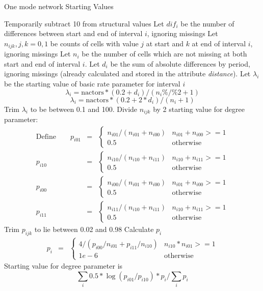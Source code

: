 \documentclass[12pt,a4paper]{article}
\makeatletter
\renewcommand{\=}{\,=\,}
\newcommand{\+}{\,+\,}
\newcommand{\nnm}[1]{\textsf{\textit{#1}}}
\renewcommand{\subsection}{\@startsection{subsection}{2}
                {0pt}{0.7\baselineskip}{0.3\baselineskip}
                {\sffamily} }
\makeatother
\begin{document}
\subsection{One mode network Starting Values}
\label{sec:onemodestart}
\begin{algorithmic}
\STATE Temporarily subtract 10 from structural values
\STATE Let $dif_i$ be the number of differences between start and end of
interval $i$, ignoring missings
\STATE Let $n_{ijk}, j, k = 0,1$ be counts of cells with value $j$ at start
and $k$ at end of interval $i$, ignoring missings
\STATE Let $n_i$ be the number of cells which are not missing at both start
and end of interval $i$.
\STATE Let $d_i$ be the sum of absolute differences by period, ignoring missings
(already calculated and stored in the attribute \nnm{distance}).
\STATE Let $\lambda_i$ be the starting value of basic rate parameter for
interval $i$
\STATE
$$\lambda_i = \mathrm{nactors} * (0.2 + d_i)/(n_i \%/\% 2 + 1)$$
\ELSE
\STATE
$$\lambda_i = \mathrm{nactors} * (0.2 + 2 * d_i)/(n_i + 1)$$
\ENDIF
\STATE Trim $\lambda_i$ to be between 0.1 and 100.
\STATE Divide $n_{ijk}$ by 2
\ENDIF
\STATE starting value for degree parameter:
\begin{align*}
\mathrm{Define } \qquad  p_{i01} &=& \begin{cases}
n_{i01}/ (n_{i01} + n_{i00}) &n_{i01} + n_{i00} >= 1  \\
0.5& \mathrm{otherwise}
\end{cases}\\
p_{i10} &=& \begin{cases}
n_{i10}/ (n_{i10} + n_{i11}) &n_{i10} + n_{i11} >= 1  \\
0.5& \mathrm{otherwise}
\end{cases}\\
  p_{i00} &=& \begin{cases}
n_{i00}/ (n_{i01} + n_{i00}) &n_{i01} + n_{i00} >= 1  \\
0.5& \mathrm{otherwise}
\end{cases}\\
p_{i11} &=& \begin{cases}
n_{i11}/ (n_{i10} + n_{i11}) &n_{i10} + n_{i11} >= 1  \\
0.5& \mathrm{otherwise}
\end{cases}
\end{align*}
\STATE Trim $p_{ijk}$ to lie between 0.02 and 0.98
\STATE Calculate $p_i$
\begin{align*}
p_i &=& \begin{cases}
4 / (p_{i00} / n_{i01} + p_{i11} / n_{i10})& n_{i10} * n_{i01} >= 1  \\
1e-6& \mathrm{otherwise}
\end{cases}
\end{align*}
\STATE Starting value for degree parameter is\\
$$ \sum_i 0.5 * \log(p_{i01} / p_{i10}) * p_i / \sum_i p_i $$
\end{algorithmic}
\end{document}
